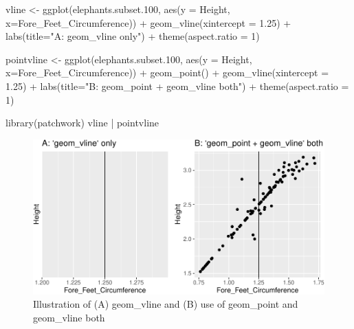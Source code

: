 \documentclass[
]{book}
\newenvironment{Shaded}{\begin{snugshade}}{\end{snugshade}}
\newcommand{\AttributeTok}[1]{\textcolor[rgb]{0.77,0.63,0.00}{#1}}
\newcommand{\DecValTok}[1]{\textcolor[rgb]{0.00,0.00,0.81}{#1}}
\newcommand{\FloatTok}[1]{\textcolor[rgb]{0.00,0.00,0.81}{#1}}
\newcommand{\FunctionTok}[1]{\textcolor[rgb]{0.00,0.00,0.00}{#1}}
\newcommand{\NormalTok}[1]{#1}
\newcommand{\OtherTok}[1]{\textcolor[rgb]{0.56,0.35,0.01}{#1}}
\newcommand{\SpecialCharTok}[1]{\textcolor[rgb]{0.00,0.00,0.00}{#1}}
\newcommand{\StringTok}[1]{\textcolor[rgb]{0.31,0.60,0.02}{#1}}
\begin{document}
\begin{Shaded}
\begin{Highlighting}[]
\NormalTok{vline }\OtherTok{\textless{}{-}} \FunctionTok{ggplot}\NormalTok{(elephants.subset}\FloatTok{.100}\NormalTok{, }\FunctionTok{aes}\NormalTok{(}\AttributeTok{y =}\NormalTok{ Height, }\AttributeTok{x=}\NormalTok{Fore\_Feet\_Circumference)) }\SpecialCharTok{+} \FunctionTok{geom\_vline}\NormalTok{(}\AttributeTok{xintercept =} \FloatTok{1.25}\NormalTok{) }\SpecialCharTok{+} 
  \FunctionTok{labs}\NormalTok{(}\AttributeTok{title=}\StringTok{"A: \textasciigrave{}geom\_vline\textasciigrave{} only"}\NormalTok{) }\SpecialCharTok{+}
  \FunctionTok{theme}\NormalTok{(}\AttributeTok{aspect.ratio =} \DecValTok{1}\NormalTok{)}

\NormalTok{pointvline }\OtherTok{\textless{}{-}} \FunctionTok{ggplot}\NormalTok{(elephants.subset}\FloatTok{.100}\NormalTok{, }\FunctionTok{aes}\NormalTok{(}\AttributeTok{y =}\NormalTok{ Height, }\AttributeTok{x=}\NormalTok{Fore\_Feet\_Circumference)) }\SpecialCharTok{+} 
  \FunctionTok{geom\_point}\NormalTok{() }\SpecialCharTok{+} 
  \FunctionTok{geom\_vline}\NormalTok{(}\AttributeTok{xintercept =} \FloatTok{1.25}\NormalTok{) }\SpecialCharTok{+} 
  \FunctionTok{labs}\NormalTok{(}\AttributeTok{title=}\StringTok{"B: \textasciigrave{}geom\_point + geom\_vline\textasciigrave{} both"}\NormalTok{) }\SpecialCharTok{+}
  \FunctionTok{theme}\NormalTok{(}\AttributeTok{aspect.ratio =} \DecValTok{1}\NormalTok{)}

\FunctionTok{library}\NormalTok{(patchwork)}
\NormalTok{vline }\SpecialCharTok{|}\NormalTok{ pointvline}
\end{Highlighting}
\end{Shaded}

\begin{figure}
\centering
\includegraphics{Data-Visualisation-geom-Encyclopedia_files/figure-latex/unnamed-chunk-50-1.pdf}
\caption{\label{fig:unnamed-chunk-50}Illustration of (A) geom\_vline and (B) use of geom\_point and geom\_vline both}
\end{figure}
\end{document}
